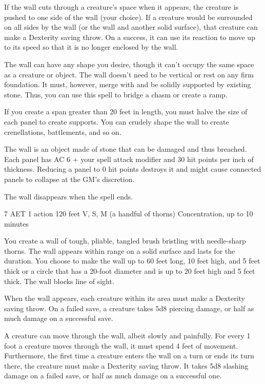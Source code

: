 If the wall cuts through a creature's space when it appears, the creature is pushed to one side of the wall (your choice). If a creature would be surrounded on all sides by the wall (or the wall and another solid surface), that creature can make a Dexterity saving throw. On a success, it can use its reaction to move up to its speed so that it is no longer enclosed by the wall.

The wall can have any shape you desire, though it can't occupy the same space as a creature or object. The wall doesn't need to be vertical or rest on any firm foundation. It must, however, merge with and be solidly supported by existing stone. Thus, you can use this spell to bridge a chasm or create a ramp.

If you create a span greater than 20 feet in length, you must halve the size of each panel to create supports. You can crudely shape the wall to create crenellations, battlements, and so on.

The wall is an object made of stone that can be damaged and thus breached. Each panel has AC 6 + your spell attack modifier and 30 hit points per inch of thickness. Reducing a panel to 0 hit points destroys it and might cause connected panels to collapse at the GM's discretion.

The wall disappears when the spell ends.


{7 AET}
{1 action}
{120 feet}
{V, S, M (a handful of thorns)}
{Concentration, up to 10 minutes}

You create a wall of tough, pliable, tangled brush bristling with needle-sharp thorns. The wall appears within range on a solid surface and lasts for the duration. You choose to make the wall up to 60 feet long, 10 feet high, and 5 feet thick or a circle that has a 20-foot diameter and is up to 20 feet high and 5 feet thick. The wall blocks line of sight.

When the wall appears, each creature within its area must make a Dexterity saving throw. On a failed save, a creature takes 5d8 piercing damage, or half as much damage on a successful save.

A creature can move through the wall, albeit slowly and painfully. For every 1 foot a creature moves through the wall, it must spend 4 feet of movement. Furthermore, the first time a creature enters the wall on a turn or ends its turn there, the creature must make a Dexterity saving throw. It takes 5d8 slashing damage on a failed save, or half as much damage on a successful one.

